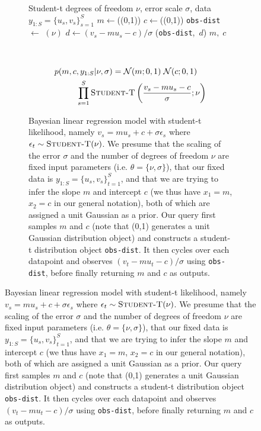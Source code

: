 \begin{figure}[p]
	\centering
	\begin{subfigure}[t]{\textwidth}
		\centering	
		\begin{minipage}[t]{0.48\textwidth}
		\begin{algorithmic}[1]
			\renewcommand{\algorithmicrequire}{\textbf{Inputs:}}
			\renewcommand{\algorithmicensure}{\textbf{Outputs:}}			 
			\Require Student-t degrees of freedom $\nu$, error
			scale $\sigma$, data $y_{1:S} = \{u_s,v_s\}_{s=1}^S$
			\State $m\leftarrow$\sample(\normal(0,1))
			\State $c\leftarrow$\sample(\normal(0,1))
			\State \lstinline$obs-dist$\xspace $\leftarrow$ \studentt $(\nu)$
			\State $d \leftarrow (v_s-m u_s - c)/\sigma$
			\State \observe(\lstinline$obs-dist$\xspace,~$d$)
			\EndFor
			\State \Return $m, \; c$
		\end{algorithmic}
		\end{minipage}
		~~
		\begin{minipage}[t]{0.48\textwidth}
			\vfill
			\resizebox{\textwidth}{!}{
				}
			{\small
			\begin{align*}
			p(m,c&, y_{1:S} | \nu, \sigma)= \mathcal{N}(m;0,1) \; \mathcal{N}(c;0,1) \\
										&\prod_{s=1}^{S} \textsc{Student-T} \left(\frac{v_s-mu_s-c}{\sigma} ; \nu \right)
			\end{align*}}
		\end{minipage}
		\caption{Bayesian linear regression model with student-t likelihood, namely
			$v_s = m u_s + c + \sigma \epsilon_s$ where $\epsilon_t \sim \textsc{Student-T}(\nu)$.
			We presume that the scaling of the error $\sigma$ and the number of degrees of freedom $\nu$
			are fixed input parameters (i.e. $\theta=\{\nu,\sigma\}$), that our fixed data is $y_{1:S} = \{u_s,v_s\}_{t=1}^S$,
		 and that we are trying to infer the slope $m$ and intercept $c$ (we thus have $x_1=m$, $x_2=c$ in our
		 general notation), both of which are assigned a unit Gaussian as a prior.  Our query
			first samples $m$ and $c$ (note that \normal(0,1) generates a unit Gaussian distribution object)
			and constructs a student-t distribution object \lstinline$obs-dist$.  It then cycles
		  over each datapoint and observes $(v_t-m u_t -c)/\sigma$ using \lstinline$obs-dist$,
		  before finally returning $m$ and $c$ as outputs.  
}
\end{subfigure}
\end{figure}
